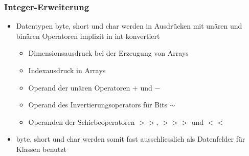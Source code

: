 \documentclass[a4paper,10pt]{article}
\begin{document}
\subsubsection{Integer-Erweiterung}
\begin{itemize}
	\item Datentypen byte, short und char werden in Ausdr\"ucken mit un\"aren und bin\"aren Operatoren implizit in int konvertiert
		\begin{itemize}
			\item Dimensionsausdruck bei der Erzeugung von Arrays
			\item Indexausdruck in Arrays
			\item Operand der un\"aren Operatoren $+$ und $ - $
			\item Operand des Invertierungsoperators f\"ur Bits $\sim$
			\item Operanden der Schiebeoperatoren $>>$, $>>>$ und $<<$
		\end{itemize}
	\item byte, short und char werden somit fast ausschliesslich als Datenfelder f\"ur Klassen benutzt
\end{itemize}
\end{document}
